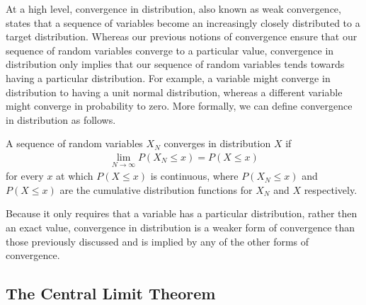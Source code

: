 At a  high level, convergence in distribution, also known as weak convergence, states that a sequence of variables become
an increasingly closely distributed to a target distribution.  Whereas our previous notions of
convergence ensure that our sequence of random variables converge to a particular value, 
convergence in distribution only implies that our sequence of random variables tends towards
having a particular distribution.  For example, a variable might converge in distribution to
having a unit normal distribution, whereas a different variable might converge in probability
to zero. More formally, we can define convergence in distribution as follows.
\begin{definition}
	A sequence of random variables $X_N$ converges in distribution $X$  if
	\begin{align}
		\lim\limits_{N\rightarrow\infty} P(X_N \le x) = P(X \le x)
	\end{align}
	for every $x$ at which $P(X\le x)$ is continuous, where $P(X_N \le x) $ and $P(X \le x)$
	are the cumulative distribution functions for $X_N$ and $X$ respectively.
\end{definition}
\noindent Because it only requires that a variable has a particular distribution, rather then an
 exact value, convergence in distribution is a weaker form of convergence than those previously
 discussed and is implied by any of the other forms of convergence.  
\vspace{5pt}

\subsection{The Central Limit Theorem}
\label{sec:inf:mc:clt}

